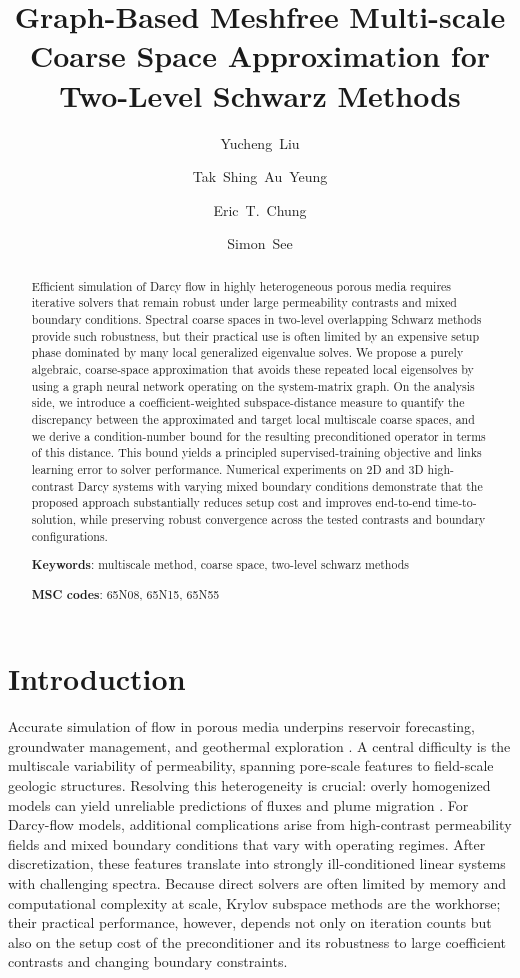 \documentclass{article}
\title{Graph-Based Meshfree Multi-scale Coarse Space Approximation for Two-Level Schwarz Methods}
\author[1]{Yucheng~Liu}
\author[2]{Tak~Shing~Au~Yeung}
\author[1]{Eric~T.~Chung}
\author[2]{Simon~See}
\affil[1]{Department of Mathematics, The Chinese University of Hong Kong, Shatin, Hong~Kong~SAR, China.}
\affil[2]{NVIDIAAI Technology Center NVAITC, NVIDIA, USA}
\date{}
\theoremstyle{definition}
\theoremstyle{remark}
\begin{document}
\maketitle

\begin{abstract}
Efficient simulation of Darcy flow in highly heterogeneous porous media requires iterative solvers that remain robust under large permeability contrasts and mixed boundary conditions. 
Spectral coarse spaces in two-level overlapping Schwarz methods provide such robustness, but their practical use is often limited by an expensive setup phase dominated by many local generalized eigenvalue solves. We propose a purely algebraic,  coarse-space approximation that avoids these repeated local eigensolves by using a graph neural network operating on the system-matrix graph. 
On the analysis side, we introduce a coefficient-weighted subspace-distance measure to quantify the discrepancy between the approximated and target local multiscale coarse spaces, and we derive a condition-number bound for the resulting preconditioned operator in terms of this distance. 
This bound yields a principled supervised-training objective and links learning error to solver performance. 
Numerical experiments on 2D and 3D high-contrast Darcy systems with varying mixed boundary conditions demonstrate that the proposed approach substantially reduces setup cost and improves end-to-end time-to-solution, while preserving robust convergence across the tested contrasts and boundary configurations.

\textbf{Keywords}: multiscale method, coarse space, two-level schwarz methods

\textbf{MSC codes}: 65N08, 65N15, 65N55
\end{abstract}

\section{Introduction}

Accurate simulation of flow in porous media underpins reservoir forecasting, groundwater management, and geothermal exploration \cite{helmig1997multiphase,zheng2002applied,abou2013petroleum}.
A central difficulty is the multiscale variability of permeability, spanning pore-scale features to field-scale geologic structures.
Resolving this heterogeneity is crucial: overly homogenized models can yield unreliable predictions of fluxes and plume migration \cite{gelhar1986stochastic,rubin2003applied}.
For Darcy-flow models, additional complications arise from high-contrast permeability fields and mixed boundary conditions that vary with operating regimes.
After discretization, these features translate into strongly ill-conditioned linear systems with challenging spectra.
Because direct solvers are often limited by memory and computational complexity at scale, Krylov subspace methods are the workhorse; their practical performance, however, depends not only on iteration counts but also on the setup cost of the preconditioner and its robustness to large coefficient contrasts and changing boundary constraints.
\end{document}
